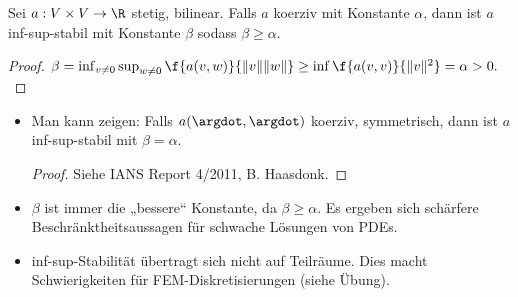 \begin{st} \label{3.33}
	Sei $a: V \times V \to \R$ stetig, bilinear.
	Falls $a$ koerziv mit Konstante $\alpha$, dann ist $a$ inf-sup-stabil mit Konstante $\beta$ sodass $\beta \ge \alpha$.
	\begin{proof}
		\begin{math}
			\beta
			= \inf_{v\neq 0} \sup_{w\neq 0} \f{a(v,w)}{\|v\|\|w\|}
			\ge \inf \f{a(v,v)}{\|v\|^2}
			= \alpha
			> 0.
		\end{math}
	\end{proof}
\end{st}

\begin{note}
	\begin{itemize}
		\item
			Man kann zeigen:
			Falls $a(\argdot, \argdot)$ koerziv, symmetrisch, dann ist $a$ inf-sup-stabil mit $\beta = \alpha$.
			\begin{proof}
				Siehe IANS Report 4/2011, B. Haasdonk.
			\end{proof}
		\item
			$\beta$ ist immer die „bessere“ Konstante, da $\beta \ge \alpha$.
			Es ergeben sich schärfere Beschränktheitsaussagen für schwache Lösungen von PDEs.
		\item
			inf-sup-Stabilität übertragt sich nicht auf Teilräume.
			Dies macht Schwierigkeiten für FEM-Diskretisierungen (siehe Übung).
	\end{itemize}
\end{note}

